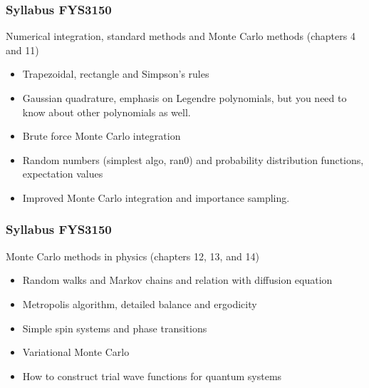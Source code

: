 \documentclass{beamer}
\begin{document}
\begin{frame}
\frametitle{Syllabus FYS3150}

\begin{block}{Numerical integration, standard methods and Monte Carlo methods (chapters 4 and 11) }
\begin{itemize}
  \item Trapezoidal, rectangle and Simpson's rules

  \item Gaussian quadrature, emphasis on Legendre polynomials, but you need to know about other polynomials as well.

  \item Brute force Monte Carlo integration

  \item Random numbers (simplest algo, ran0) and probability distribution functions, expectation values

  \item Improved Monte Carlo integration and importance sampling.
\end{itemize}

\noindent
\end{block}
\end{frame}

\begin{frame}
\frametitle{Syllabus FYS3150}

\begin{block}{Monte Carlo methods in physics (chapters 12, 13, and 14) }
\begin{itemize}
  \item Random walks and Markov chains and relation with diffusion equation

  \item Metropolis algorithm, detailed balance and ergodicity

  \item Simple spin systems and phase transitions

  \item Variational Monte Carlo

  \item How to construct trial wave functions for quantum systems
\end{itemize}

\noindent
\end{block}
\end{frame}
\end{document}
